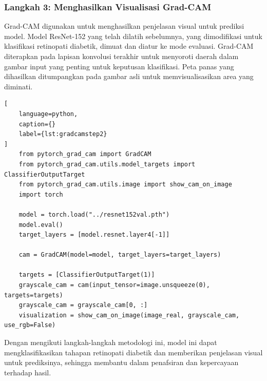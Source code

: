 \subsubsection{Langkah 3: Menghasilkan Visualisasi Grad-CAM}
Grad-CAM digunakan untuk menghasilkan penjelasan visual untuk prediksi model. Model ResNet-152 yang telah dilatih sebelumnya, yang dimodifikasi untuk klasifikasi retinopati diabetik, dimuat dan diatur ke mode evaluasi. Grad-CAM diterapkan pada lapisan konvolusi terakhir untuk menyoroti daerah dalam gambar input yang penting untuk keputusan klasifikasi. Peta panas yang dihasilkan ditumpangkan pada gambar asli untuk memvisualisasikan area yang diminati.
\begin{lstlisting}[
	language=python,
	caption={}
	label={lst:gradcamstep2}
]
	from pytorch_grad_cam import GradCAM
	from pytorch_grad_cam.utils.model_targets import ClassifierOutputTarget
	from pytorch_grad_cam.utils.image import show_cam_on_image
	import torch

	model = torch.load("../resnet152val.pth")
	model.eval()
	target_layers = [model.resnet.layer4[-1]]

	cam = GradCAM(model=model, target_layers=target_layers)

	targets = [ClassifierOutputTarget(1)]
	grayscale_cam = cam(input_tensor=image.unsqueeze(0), targets=targets)
	grayscale_cam = grayscale_cam[0, :]
	visualization = show_cam_on_image(image_real, grayscale_cam, use_rgb=False)
\end{lstlisting}
Dengan mengikuti langkah-langkah metodologi ini, model ini dapat mengklasifikasikan tahapan retinopati diabetik dan memberikan penjelasan visual untuk prediksinya, sehingga membantu dalam penafsiran dan kepercayaan terhadap hasil.